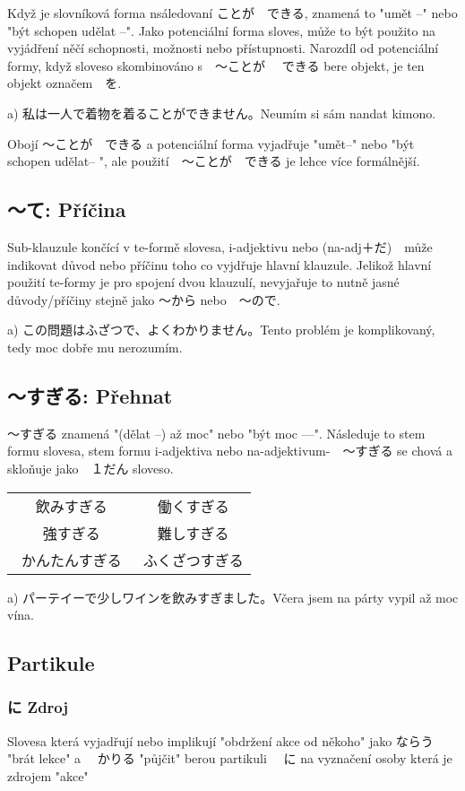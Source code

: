 Když je slovníková forma nsáledovaní ことが　できる, znamená to "umět --" nebo "být schopen udělat --". Jako potenciální forma sloves, může to být použito na vyjádření něčí schopnosti, možnosti  nebo přístupnosti. Narozdíl od potenciální formy, když sloveso skombinováno s　〜ことが 　できる bere objekt, je ten objekt označem　を.

a) 私は一人で着物を着ることができません。Neumím si sám nandat kimono.

Obojí 〜ことが　できる a potenciální forma vyjadřuje "umět--" nebo "být schopen udělat-- ", ale použití　〜ことが　できる je lehce více formálnější.


\subsection{〜て: Příčina}

Sub-klauzule končící v te-formě slovesa, i-adjektivu nebo (na-adj＋だ)　může indikovat důvod nebo příčinu toho co vyjdřuje hlavní klauzule. Jelikož hlavní použití te-formy je pro spojení dvou klauzulí, nevyjařuje to nutně jasné důvody/příčiny stejně jako  〜から nebo　〜ので.

a) この問題はふざつで、よくわかりません。Tento problém je komplikovaný, tedy moc dobře mu nerozumím.


\subsection{〜すぎる: Přehnat}

〜すぎる znamená "(dělat --) až moc" nebo "být moc ---". Následuje to stem formu slovesa, stem formu i-adjektiva nebo na-adjektivum-　〜すぎる se chová a skloňuje jako　１だん sloveso.
\begin{tabular}{cc}
飲みすぎる	&		働くすぎる\\
強すぎる　	&		難しすぎる\\
かんたんすぎる　&		ふくざつすぎる\\
\end{tabular}

a) パーテイーで少しワインを飲みすぎました。Včera jsem na párty vypil až moc vína.

\subsection{Partikule}

\subsubsection{に Zdroj}
Slovesa která vyjadřují nebo implikují "obdržení akce od někoho" jako ならう "brát lekce" a 　かりる "půjčit" berou partikuli 　に na vyznačení osoby která je zdrojem "akce"

